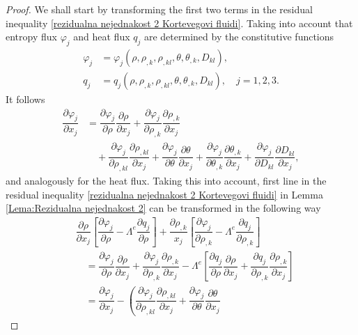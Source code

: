 \documentclass[a4paper,fleqn]{cas-sc}
\theoremstyle{definition}
\begin{document}
\begin{proof}
	We shall start by transforming the first two terms in the residual inequality \eqref{rezidualna nejednakost 2 Kortevegovi fluidi}. Taking into account that entropy flux $\varphi_{j}$ and heat flux $q_{j}$ are determined by the constitutive functions
	\begin{align*}
		\varphi_j & = \varphi_{j}(\rho, \rho_{,k}, \rho_{,kl}, \theta, \theta_{,k}, D_{kl}), 
		\\
		q_j & = q_{j}(\rho, \rho_{,k}, \rho_{,kl}, \theta, \theta_{,k}, D_{kl}), \quad 
		j = 1, 2, 3. 
	\end{align*} 
	It follows 
	\begin{align*}
		\dfrac{\partial\varphi_j}{\partial x_j}
		& = \dfrac{\partial\varphi_j}{\partial\rho}\dfrac{\partial\rho}{\partial x_j} 
		+ \dfrac{\partial\varphi_j}{\partial\rho_{,k}}\dfrac{\partial\rho_{,k}}{\partial x_j} 
		\\
		& \quad + \dfrac{\partial\varphi_j}{\partial\rho_{,kl}}\dfrac{\partial\rho_{,kl}}{\partial x_j}+\dfrac{\partial\varphi_j}{\partial\theta}\dfrac{\partial\theta}{\partial x_j}+\dfrac{\partial\varphi_j}{\partial\theta_{,k}}\dfrac{\partial\theta_{,k}}{\partial x_j}+\dfrac{\partial\varphi_j}{\partial D_{kl}}\dfrac{\partial D_{kl}}{\partial x_j},
	\end{align*}
	and analogously for the heat flux. Taking this into account, first line in the residual inequality \eqref{rezidualna nejednakost 2 Kortevegovi fluidi} in Lemma \ref{Lema:Rezidualna nejednakost 2} can be transformed in the following way
	\begin{align*}
		& \dfrac{\partial\rho}{\partial x_j} \left[ \dfrac{\partial\varphi_j}{\partial\rho} 
		- \Lambda^e\dfrac{\partial q_j}{\partial\rho} \right] 
		+ \dfrac{\partial\rho_{,k}}{x_j} \left[ \dfrac{\partial\varphi_j}{\partial\rho_{,k}} 
		- \Lambda^e\dfrac{\partial q_j}{\partial\rho_{,k}} \right] \\
		& \quad = \dfrac{\partial\varphi_j}{\partial\rho} \dfrac{\partial\rho}{\partial x_j} 
		+ \dfrac{\partial\varphi_j}{\partial\rho_{,k}} \dfrac{\partial\rho_{,k}}{\partial x_j} 
		- \Lambda^e\left[\dfrac{\partial q_j}{\partial\rho}\dfrac{\partial\rho}{\partial x_j} 
		+ \dfrac{\partial q_j}{\partial\rho_{,k}} \dfrac{\partial\rho_{,k}}{\partial x_j}\right] \\
		& \quad = \dfrac{\partial\varphi_j}{\partial x_j} - \left(   
		\dfrac{\partial\varphi_j}{\partial\rho_{,kl}} \dfrac{\partial\rho_{,kl}}{\partial x_j} 
		+ \dfrac{\partial\varphi_j}{\partial\theta} \dfrac{\partial\theta}{\partial x_j} 

\end{align*}
\end{proof}
\end{document}
